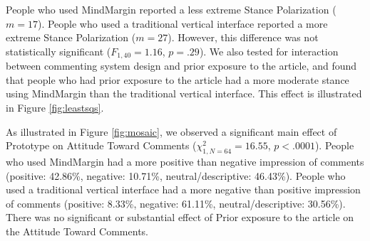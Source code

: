 People who used MindMargin reported a less extreme Stance Polarization ($m=17$). People who used a traditional vertical interface reported a more extreme Stance Polarization ($m=27$). However, this difference was not statistically significant ($F_{1,40}=1.16$, $p=.29$). We also tested for interaction between commenting system design and prior exposure to the article, and found that people who had prior exposure to the article had a more moderate stance using MindMargin than the traditional vertical interface. This effect is illustrated in Figure \ref{fig:leastsqs}. 




As illustrated in Figure \ref{fig:mosaic}, we observed a significant main effect of Prototype on Attitude Toward Comments ($\chi^2_{1,N=64}=16.55$, $p<.0001$).
People who used MindMargin had a more positive than negative impression of comments (positive: 42.86\%, negative: 10.71\%, neutral/descriptive: 46.43\%). People who used a traditional vertical interface had a more negative than positive impression of comments (positive: 8.33\%, negative: 61.11\%, neutral/descriptive: 30.56\%). There was no significant or substantial effect of Prior exposure to the article on the Attitude Toward Comments.  %

